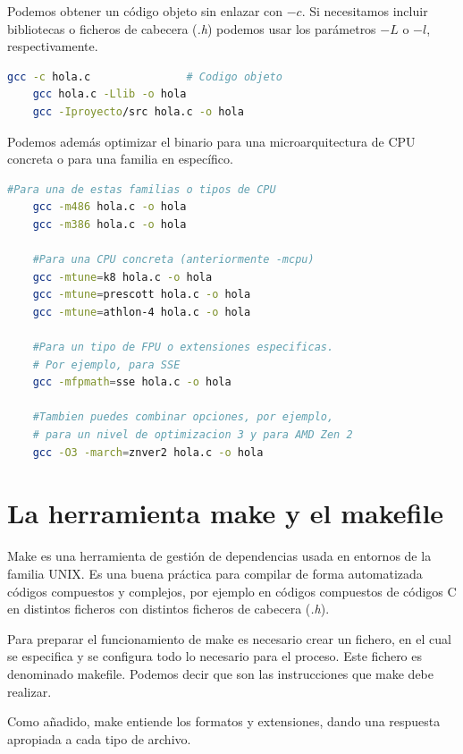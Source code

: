 \documentclass[a4paper, 11pt, titlepage]{article}
\begin{document}
        Podemos obtener un código objeto sin enlazar con $-c$. Si necesitamos incluir bibliotecas o ficheros de 
        cabecera (\textit{.h}) podemos usar los parámetros $-L$ o $-l$, respectivamente.
         
        \begin{lstlisting}[language=bash]
    gcc -c hola.c               # Codigo objeto
    gcc hola.c -Llib -o hola
    gcc -Iproyecto/src hola.c -o hola\end{lstlisting}

        Podemos además optimizar el binario para una microarquitectura de CPU concreta o para una familia en específico.

        \begin{lstlisting}[language=bash,basicstyle=\small]
    #Para una de estas familias o tipos de CPU
    gcc -m486 hola.c -o hola
    gcc -m386 hola.c -o hola
    
    #Para una CPU concreta (anteriormente -mcpu)
    gcc -mtune=k8 hola.c -o hola
    gcc -mtune=prescott hola.c -o hola
    gcc -mtune=athlon-4 hola.c -o hola
    
    #Para un tipo de FPU o extensiones especificas. 
    # Por ejemplo, para SSE
    gcc -mfpmath=sse hola.c -o hola
    
    #Tambien puedes combinar opciones, por ejemplo, 
    # para un nivel de optimizacion 3 y para AMD Zen 2
    gcc -O3 -march=znver2 hola.c -o hola \end{lstlisting}

\section{La herramienta make y el makefile}\label{make}

    Make es una herramienta de gestión de dependencias usada en entornos de la familia UNIX. 
    Es una buena práctica para compilar de forma automatizada códigos compuestos y complejos, 
    por ejemplo en códigos compuestos de códigos C en distintos ficheros con distintos ficheros
    de cabecera (\textit{.h}).

    Para preparar el funcionamiento de make es necesario crear un fichero, en el cual se especifica
    y se configura todo lo necesario para el proceso. Este fichero es denominado makefile. Podemos
    decir que son las instrucciones que make debe realizar.

    Como añadido, make entiende los formatos y extensiones, dando una respuesta apropiada a cada tipo
    de archivo.
\end{document}
